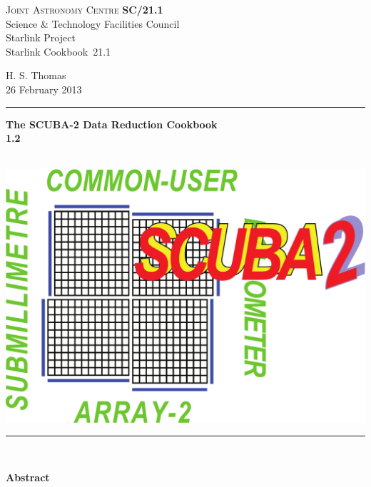 \documentclass[twoside,11pt]{article}
\newcommand{\stardoccategory} {Starlink Cookbook}
\newcommand{\stardocinitials} {SC}
\newcommand{\stardocnumber} {21.1}
\newcommand{\stardocauthors} {H. S. Thomas}
\newcommand{\stardocdate} {26 February 2013}
\newcommand{\stardoctitle} {The SCUBA-2 Data Reduction Cookbook}
\newcommand{\stardocversion} {1.2}
\newcommand{\stardocmanual} {\ }
\newcommand{\stardocname}{\stardocinitials /\stardocnumber}
\newenvironment{latexonly}{}{}
\renewcommand{\_}{\texttt{\symbol{95}}}
\begin{document}
\thispagestyle{empty}

\begin{latexonly}
   \textsc{Joint Astronomy Centre} \hfill \textbf{\stardocname}\\
   {\large Science \& Technology Facilities Council}\\
   {\large Starlink Project\\}
   {\large \stardoccategory\ \stardocnumber}
   \begin{flushright}
   \stardocauthors\\
   \stardocdate
   \end{flushright}
   \vspace{-4mm}
   \rule{\textwidth}{0.5mm}
   \vspace{5mm}
   \begin{center}
   {\Huge\textbf{\stardoctitle \\ [2.5ex]}}
   {\LARGE\textbf{\stardocversion \\ [4ex]}}
   {\Huge\textbf{\stardocmanual}}
   \end{center}
   \vspace{5mm}

   \begin{center}
   \includegraphics[scale=0.4]{sc21_s2logo}
   \end{center}
   \vspace{5mm}
   \rule{\textwidth}{0.5mm}\\
   \vspace{15mm}

   \vspace{10mm}
   \begin{center}
      {\Large\textbf{Abstract}}
   \end{center}
\end{latexonly}
\end{document}

